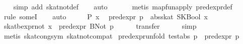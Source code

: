 \begin{isabellebody}
%
\isadelimproof
\ \ %
\endisadelimproof
%
\isatagproof
{}\isamarkupfalse%
\ {}simp\ add{}\ skat{}not{}def{}\isanewline
\ \ \isamarkupfalse%
\ auto\isanewline
\ \ \isamarkupfalse%
\isanewline
\ \ \isamarkupfalse%
\ {}metis\ map{}fun{}apply\ pred{}expr{}def{}\isanewline
\ \ \isamarkupfalse%
\ {}rule\ someI{}{}\isanewline
\ \ \isamarkupfalse%
\ auto\isanewline
{}\isamarkupfalse%
\ {}\isanewline
\ \ \isamarkupfalse%
\ P\ x\ \isamarkupfalse%
\ {}pred{}expr\ p\ {}\ abs{}skat\ {}SKBool\ x{}{}\isanewline
\ \ \isamarkupfalse%
\ {}skat{}bexpr{}not\ x\ {}\ pred{}expr\ {}BNot\ p{}{}\isanewline
\ \ \ \ \isamarkupfalse%
\ transfer\isanewline
\ \ \ \ \isamarkupfalse%
\ simp\isanewline
\ \ \ \ \isamarkupfalse%
\ {}metis\ skat{}cong{}sym\ skat{}not{}compat{}\isanewline
{}\isamarkupfalse%
%
\endisatagproof
{\isafoldproof}%
%
\isadelimproof
\isanewline
%
\endisadelimproof
\isanewline
{}\isamarkupfalse%
\ pred{}expr{}unfold{}\ {}test{}abs\ p\ {}\ pred{}expr\ p{}\isanewline

\end{isabellebody}
